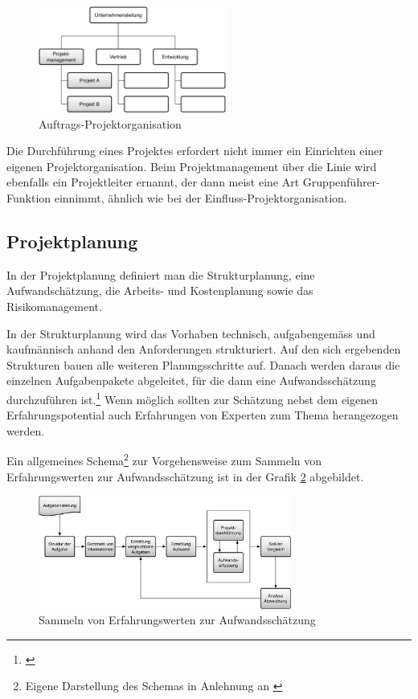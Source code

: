 \begin{figure}[htbp]
\begin{center}
\includegraphics[width=0.55\textwidth,angle=0]{./bilder/theorie/05_projektorganisationen_auftrags.pdf}
\caption{Auftrags-Projektorganisation}
\label{pic:05_projektorganisationen_auftrags}
\end{center}
\end{figure}

Die Durchführung eines Projektes erfordert nicht immer ein Einrichten einer eigenen
Projektorganisation. Beim Projektmanagement über die Linie wird ebenfalls ein
Projektleiter ernannt, der dann meist eine Art Gruppenführer-Funktion einnimmt,
ähnlich wie bei der Einfluss-Projektorganisation.

\subsection{Projektplanung}
In der Projektplanung definiert man die Strukturplanung, eine Aufwandschätzung,
die Arbeits- und Kostenplanung sowie das Risikomanagement.

In der Strukturplanung wird das Vorhaben technisch, aufgabengemäss und kaufmännisch
anhand den Anforderungen strukturiert. Auf den sich ergebenden Strukturen bauen
alle weiteren Planungsschritte auf. Danach werden daraus die einzelnen Aufgabenpakete
abgeleitet, für die dann eine Aufwandsschätzung durchzuführen ist.\footnote{\citealp*[Vgl.][S. 14]{burghardt2007einfuehrung}}
Wenn möglich sollten zur Schätzung nebst dem eigenen Erfahrungspotential auch
Erfahrungen von Experten zum Thema herangezogen werden.

Ein allgemeines Schema\footnote{Eigene Darstellung des Schemas in Anlehnung an \citealp*[S. 112]{litke2007projektmanagement}}
zur Vorgehensweise zum Sammeln von Erfahrungswerten zur Aufwandsschätzung ist in der Grafik \ref{pic:02_schema_aufwandsschaetzung}
abgebildet.

\begin{figure}[htbp]
\begin{center}
\includegraphics[width=0.74\textwidth,angle=0]{./bilder/theorie/02_schema_aufwandsschaetzung.pdf}
\caption{Sammeln von Erfahrungswerten zur Aufwandsschätzung}
\label{pic:02_schema_aufwandsschaetzung}
\end{center}
\end{figure}

